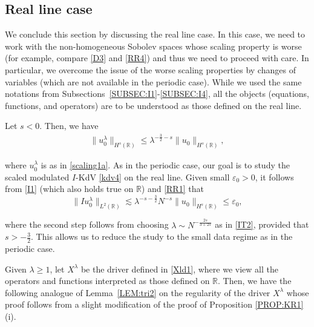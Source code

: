\documentclass[letterpaper, 11pt,  reqno]{amsart}
\newcommand{\1}{\hspace{0.5mm}\text{I}\hspace{0.5mm}}
\newcommand{\noi}{\noindent}
\newcommand{\R}{\mathbb{R}}
\newcommand{\eps}{\varepsilon}
\newcommand{\ld}{\lambda}
\newcommand{\les}{\lesssim}
\numberwithin{equation}{section}
\numberwithin{theorem}{section}
\begin{document}
\subsection{Real line case}
\label{SUBSEC:I5}


We conclude this section by discussing the real line case.
In this case, we need to work with the non-homogeneous Sobolev spaces whose
scaling property is worse
(for example, compare \eqref{D3} and \eqref{RR4})
and thus we need to proceed with care.
In particular, we overcome the issue of the worse scaling properties
by changes of variables
(which are not available in the periodic case).
While we used the same notations from Subsections~\ref{SUBSEC:I1}-\ref{SUBSEC:I4}, 
 all the objects 
(equations, functions, and operators) are 
to be understood as those defined on the real line.






Let $s < 0$.
Then, we have 
\begin{align}
\|u_0^\ld\|_{ H^s(\R)}
\le  \ld^{-\frac 32 - s} \|u_0\|_{ H^s(\R)}, 
\label{RR1}
\end{align}

\noi
where $u_0^\ld$ is as in \eqref{scaling1a}.
As in the periodic case, 
our goal is to study the scaled modulated $I$-KdV \eqref{kdv4}
on the real line.
Given small $\eps_0 > 0$, it follows from 
\eqref{I1} (which also holds true on $\R$)
and  \eqref{RR1} that
\begin{equation*}
 \| I  u_0^{\ld} \|_{L^2(\R) }
 \les \ld^{-s-\frac 32} N^{-s} \|  u_0  \|_{H^{s}(\R)}
 \le \eps_0 , 
\end{equation*}


\noi
where the second step 
follows from choosing 
$\ld \sim N^{-\frac{2s}{3+2s}}$ as in \eqref{IT2}, 
provided that $s > -\frac 32$.
This allows us to reduce the study to the small data regime
as in the periodic case.




Given $\ld \ge 1$, let $X^\ld$ be the driver defined in \eqref{Xld1}, 
where we view all the operators and functions 
interpreted as those defined on $\R$.
Then, we have the following 
analogue of Lemma~\ref{LEM:tri2}
on the regularity of the driver $X^\ld$ 
whose proof follows
from a slight modification of the proof of 
Proposition \ref{PROP:KR1}\,(i).
\end{document}
